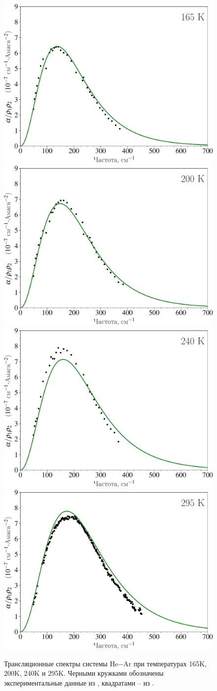 \begin{figure}[H]
    \centering
    \includegraphics[width=0.49\linewidth]{./pictures/two_atom_spectra/alpha_165K-crop.pdf} 
    \includegraphics[width=0.49\linewidth]{./pictures/two_atom_spectra/alpha_200K-crop.pdf} \\
    \includegraphics[width=0.49\linewidth]{./pictures/two_atom_spectra/alpha_240K-crop.pdf}
    \includegraphics[width=0.49\linewidth]{./pictures/two_atom_spectra/alpha_295K-crop.pdf}
    \caption{Трансляционные спектры системы He$-$Ar при температурах 165K, 200K, 240K и 295K. Черными кружками обозначены экспериментальные данные из \cite{bukhtoyarova1977, bukhtoyarova1977_2, ryzhov1974}, квадратами -- из \cite{bosomworth1965_part2}.}
    \label{fig:two-atom-spectra}
\end{figure}

